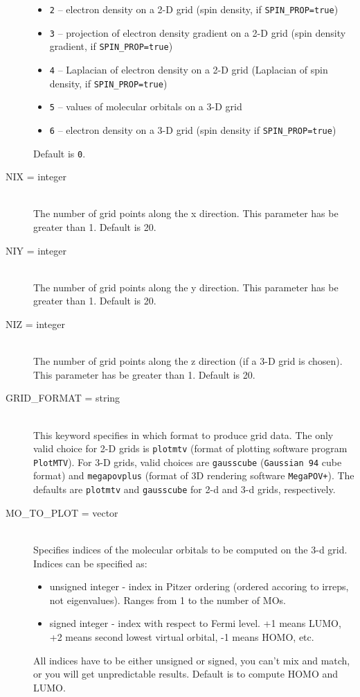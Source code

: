 \begin{description}
\begin{itemize}
\item {\tt 2} -- electron density on a 2-D grid (spin density, if {\tt SPIN\_PROP=true})
\item {\tt 3} -- projection of electron density gradient on a 2-D grid (spin density
gradient, if {\tt SPIN\_PROP=true})
\item {\tt 4} -- Laplacian of electron density on a 2-D grid (Laplacian of
spin density, if {\tt SPIN\_PROP=true})
\item {\tt 5} -- values of molecular orbitals on a 3-D grid
\item {\tt 6} -- electron density on a 3-D grid (spin density if {\tt SPIN\_PROP=true})
\end{itemize}
Default is {\tt 0}.

\item[NIX = integer]\mbox{}\\
The number of grid points along the x direction. This parameter has be greater than 1.
Default is 20.

\item[NIY = integer]\mbox{}\\
The number of grid points along the y direction. This parameter has be greater than 1.
Default is 20.

\item[NIZ = integer]\mbox{}\\
The number of grid points along the z direction (if a 3-D grid is chosen).
This parameter has be greater than 1. Default is 20.

\item[GRID\_FORMAT = string]\mbox{}\\
This keyword specifies in which format to produce grid data. The only valid choice
for 2-D grids is {\tt plotmtv} (format of plotting software program {\tt PlotMTV}).
For 3-D grids, valid choices are {\tt gausscube} ({\tt Gaussian 94} cube format)
and {\tt megapovplus} (format of 3D rendering software {\tt MegaPOV+}).
The defaults are {\tt plotmtv} and {\tt gausscube} for 2-d and 3-d grids,
respectively.

\item[MO\_TO\_PLOT = vector]\mbox{}\\
Specifies indices of the molecular orbitals to be computed on the 3-d grid. Indices can be specified
as:
\begin{itemize}
\item
unsigned integer - index in Pitzer ordering (ordered accoring to irreps, not eigenvalues).
Ranges from 1 to the number of MOs.
\item
signed integer - index with respect to Fermi level. +1 means LUMO, +2 means
second lowest virtual orbital, -1 means HOMO, etc.
\end{itemize}
All indices have to be either unsigned or signed, you can't mix and match,
or you will get unpredictable results.
Default is to compute HOMO and LUMO.


\end{description}
